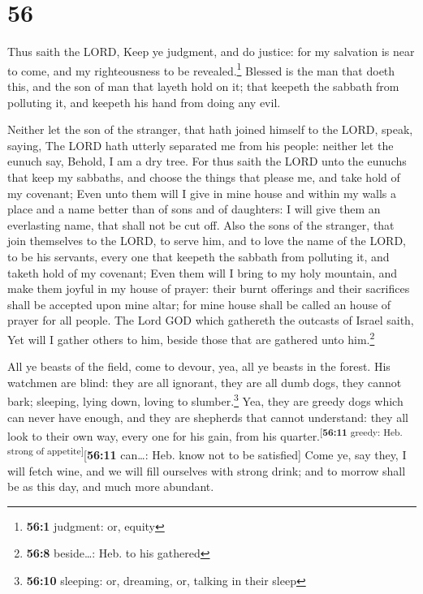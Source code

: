 \hypertarget{section-55}{%
\section{56}\label{section-55}}

 Thus saith the LORD, Keep ye judgment, and do justice:
for my salvation is near to come, and my righteousness to be
revealed.\footnote{\textbf{56:1} judgment: or, equity} 
Blessed is the man that doeth this, and the son of man that layeth hold
on it; that keepeth the sabbath from polluting it, and keepeth his hand
from doing any evil.

 Neither let the son of the stranger, that hath joined
himself to the LORD, speak, saying, The LORD hath utterly separated me
from his people: neither let the eunuch say, Behold, I am a dry tree.
 For thus saith the LORD unto the eunuchs that keep my
sabbaths, and choose the things that please me, and take hold of my
covenant;  Even unto them will I give in mine house and
within my walls a place and a name better than of sons and of daughters:
I will give them an everlasting name, that shall not be cut off.
 Also the sons of the stranger, that join themselves to
the LORD, to serve him, and to love the name of the LORD, to be his
servants, every one that keepeth the sabbath from polluting it, and
taketh hold of my covenant;  Even them will I bring to my
holy mountain, and make them joyful in my house of prayer: their burnt
offerings and their sacrifices shall be accepted upon mine altar; for
mine house shall be called an house of prayer for all people.
 The Lord GOD which gathereth the outcasts of Israel
saith, Yet will I gather others to him, beside those that are gathered
unto him.\footnote{\textbf{56:8} beside\ldots: Heb. to his gathered}

 All ye beasts of the field, come to devour, yea, all ye
beasts in the forest.  His watchmen are blind: they are
all ignorant, they are all dumb dogs, they cannot bark; sleeping, lying
down, loving to slumber.\footnote{\textbf{56:10} sleeping: or, dreaming,
  or, talking in their sleep}  Yea, they are greedy dogs
which can never have enough, and they are shepherds that cannot
understand: they all look to their own way, every one for his gain, from
his quarter.\textsuperscript{{[}\textbf{56:11} greedy: Heb. strong of
appetite{]}}{[}\textbf{56:11} can\ldots: Heb. know not to be
satisfied{]}  Come ye, say they, I will fetch wine, and
we will fill ourselves with strong drink; and to morrow shall be as this
day, and much more abundant.

